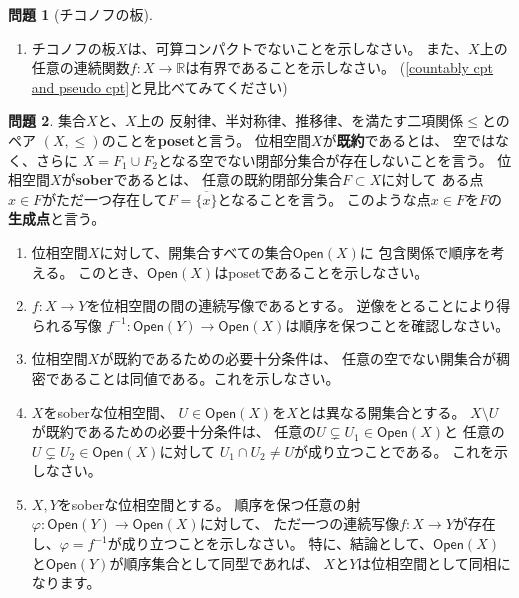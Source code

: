\documentclass[uplatex]{jsarticle}
\theoremstyle{definition}
\newtheorem{prob}[prob]{問題}
\newcommand{\dfn}{:\overset{\mbox{{\scriptsize def}}}{=}}
\newcommand{\R}{\mathbb{R}}
\begin{document}
\begin{prob}[チコノフの板]
\begin{enumerate}
\begin{itemize}
    \end{itemize}
    \(X\dfn (\omega_1 + 1)\times (\omega_0 + 1) \setminus \{(\omega_1,\omega_0)\}\)
    に積位相の相対位相を入れる。
    \(X\)は正則であるが正規でないことを証明しなさい。
    (Hint: 正規でないことを示すためには、閉部分集合
    \(F\dfn X\cap \left((\omega_1 + 1)\times\{\omega_0\}\right)\),
    \(H\dfn X\cap \left(\{\omega_1\}\times (\omega_0 + 1)\right)\)
    を考え、これらをそれぞれ含む開集合が必ず交わることを証明すると良い)
    この\(X\)は\textbf{チコノフの板}と呼ばれています。
    \item
    チコノフの板\(X\)は、可算コンパクトでないことを示しなさい。
    また、\(X\)上の任意の連続関数\(f:X\to \R\)は有界であることを示しなさい。
    (\autoref{countably cpt and pseudo cpt}と見比べてみてください)
  \end{enumerate}
\end{prob}




\begin{prob}
  集合\(X\)と、\(X\)上の
  反射律、半対称律、推移律、を満たす二項関係\(\leq\)とのペア
  \((X,\leq)\)のことを\textbf{poset}と言う。
  位相空間\(X\)が\textbf{既約}であるとは、
  空ではなく、さらに
  \(X = F_1\cup F_2\)となる空でない閉部分集合が存在しないことを言う。
  位相空間\(X\)が\textbf{sober}であるとは、
  任意の既約閉部分集合\(F\subset X\)に対して
  ある点\(x\in F\)がただ一つ存在して\(F=\overline{\{x\}}\)となることを言う。
  このような点\(x\in F\)を\(F\)の\textbf{生成点}と言う。
  \begin{enumerate}
    \item
    位相空間\(X\)に対して、開集合すべての集合\(\mathsf{Open}(X)\)に
    包含関係で順序を考える。
    このとき、\(\mathsf{Open}(X)\)はposetであることを示しなさい。
    \item
    \(f:X\to Y\)を位相空間の間の連続写像であるとする。
    逆像をとることにより得られる写像
    \(f^{-1}:\mathsf{Open}(Y)\to \mathsf{Open}(X)\)は順序を保つことを確認しなさい。
    \item
    位相空間\(X\)が既約であるための必要十分条件は、
    任意の空でない開集合が稠密であることは同値である。これを示しなさい。
    \item
    \(X\)をsoberな位相空間、
    \(U\in \mathsf{Open}(X)\)を\(X\)とは異なる開集合とする。
    \(X\setminus U\)が既約であるための必要十分条件は、
    任意の\(U\subsetneq U_1\in \mathsf{Open}(X)\)と
    任意の\(U\subsetneq U_2\in \mathsf{Open}(X)\)に対して
    \(U_1\cap U_2 \neq U\)が成り立つことである。
    これを示しなさい。
    \item
    \(X,Y\)をsoberな位相空間とする。
    順序を保つ任意の射\(\varphi: \mathsf{Open}(Y)\to \mathsf{Open}(X)\)に対して、
    ただ一つの連続写像\(f:X\to Y\)が存在し、\(\varphi = f^{-1}\)が成り立つことを示しなさい。
    特に、結論として、\(\mathsf{Open}(X)\)と\(\mathsf{Open}(Y)\)が順序集合として同型であれば、
    \(X\)と\(Y\)は位相空間として同相になります。
  \end{enumerate}
\end{prob}
\end{document}
